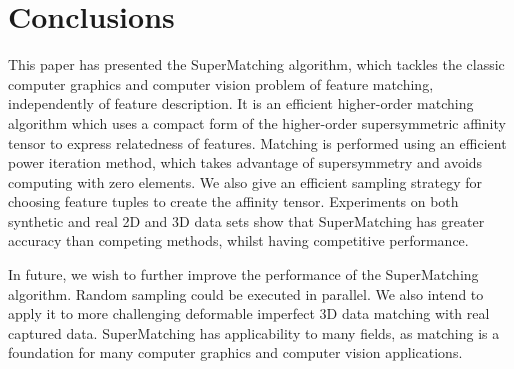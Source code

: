 \section{Conclusions}
\label{sec:conclusion}

This paper has presented the SuperMatching algorithm,
which tackles the classic computer graphics and computer vision problem of feature matching, independently of feature description.
It is an efficient higher-order matching algorithm which uses a compact form of the higher-order supersymmetric affinity tensor to express relatedness of features.
Matching is performed using an efficient power iteration method, which takes advantage of supersymmetry and avoids computing with zero elements.
We also give an efficient sampling strategy for choosing feature tuples to create the affinity tensor.
Experiments on both synthetic and real 2D and 3D data sets show that
SuperMatching has greater accuracy than competing methods, whilst having competitive performance.

In future, we wish to further improve the performance of the SuperMatching algorithm.
Random sampling could be executed in parallel.
We also intend to apply it to more challenging deformable imperfect 3D data matching with real captured data.
SuperMatching has applicability to many fields,
as matching is a foundation for many computer graphics and computer vision applications.




